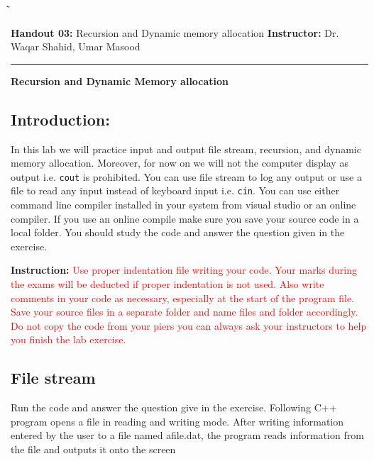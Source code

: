 \documentclass{article}
\newcommand{\red}[1]{\textcolor{red}{#1}}
\begin{document}
\begin{tabbing}
  \`\=\kill
  
  \textbf{Handout 03:} Recursion and Dynamic memory allocation 
  \` \textbf{Instructor:} Dr. Waqar Shahid, Umar Masood
\end{tabbing}

\hrule

\vspace{.25in}

\begin{center}
\textbf{\Large Recursion and Dynamic Memory allocation}
\end{center}

\vspace{.15in}

\subsection*{Introduction:} 
\noindent In this lab we will practice input and output file stream, recursion, and dynamic memory allocation. Moreover, for now on we will not the computer display as output i.e. \verb|cout| is prohibited. You can use file stream to log any output or use a file to read any input instead of keyboard input i.e. \verb|cin|. You can use either command line compiler installed in your system from visual studio or an online compiler. If  you use an online compile make sure you save your source code in a local folder. You should study the code and answer the question given in the exercise.

\medskip

\noindent \textbf{Instruction: }\red{ Use proper indentation file writing your code. Your marks during the exams will be deducted if proper indentation is not used. Also write comments in your code as necessary, especially at the start of the program file. Save your source files in a separate folder and name files and folder accordingly. Do not copy the code from your piers you can always ask your instructors to help you finish the lab exercise.}

\subsection*{File stream}
\noindent Run the code and answer the question give in the exercise. Following C++ program opens a file in reading and writing mode. After writing information entered by the user to a file named afile.dat, the program reads information from the file and outputs it onto the screen
\end{document}
